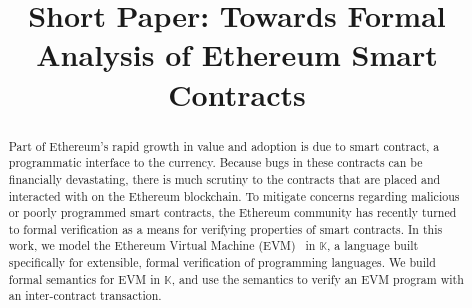 \documentclass{llncs}
\begin{document}
\thispagestyle{empty}

\title{Short Paper: Towards Formal Analysis of Ethereum  Smart Contracts}

\newif\ifblind\blindfalse %

\ifblind
\author{Everett Hildenbrandt\inst{1} \and Manasvi Saxena\inst{1} \and Deepak
Kumar\inst{1} \and Zane Ma\inst{1}}

\institute{University of Illinois, Urbana-Champaign}
\else
\author{}
\institute{}
\fi

\newcommand{\K}{$\mathbb{K}$}

\maketitle
\begin{abstract}
Part of Ethereum's rapid growth in value and adoption is due to
smart contract, a  programmatic interface to the currency. Because bugs in
these contracts can be financially devastating, there is much scrutiny to the contracts that are
placed and interacted with on the Ethereum blockchain. To mitigate concerns
regarding malicious or poorly programmed smart contracts, the Ethereum community
has recently turned to formal verification as a means for verifying properties
of smart contracts. In this work, we model the Ethereum Virtual Machine
(EVM)~\cite{wood2014ethereum} in \K{}, a language built
specifically for extensible, formal verification of programming languages. We
build formal semantics for EVM in \K{}, and use the semantics to verify an EVM
program with an inter-contract transaction.
\end{abstract}
% 










\small

\nocite{*}
\end{document}
